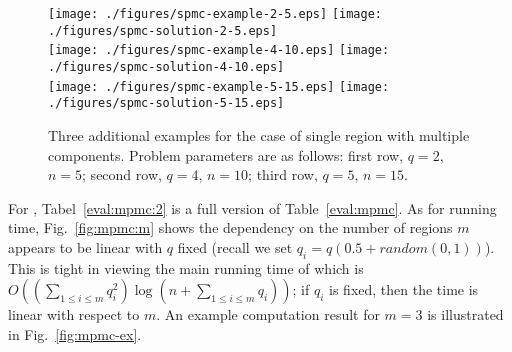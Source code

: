 \begin{figure}[ht!]
    \centering
    \texttt{[image: ./figures/spmc-example-2-5.eps]}
    \texttt{[image: ./figures/spmc-solution-2-5.eps]}
    \vspace*{2mm} \\
    \texttt{[image: ./figures/spmc-example-4-10.eps]}
    \texttt{[image: ./figures/spmc-solution-4-10.eps]} \\
    \vspace*{2mm}
    \texttt{[image: ./figures/spmc-example-5-15.eps]}
    \hspace{5mm}
    \texttt{[image: ./figures/spmc-solution-5-15.eps]}
    \vspace*{-3mm}
    \caption{\label{fig:opg-more-spmc-ex} Three additional examples for the 
		case of single region with multiple components. Problem parameters 
		are as follows: first row, $q = 2$, $n = 5$; second row, $q = 4$, 
		$n = 10$; third row, $q = 5$, $n = 15$.} 
    \vspace*{-4mm}
\end{figure}


For \algoMRG, Tabel~\ref{eval:mpmc:2} is a full version of 
Table~\ref{eval:mpmc}. As for running time, Fig.~\ref{fig:mpmc:m} shows 
the dependency on the number of regions $m$ appears to be linear with 
$q$ fixed (recall we set $q_i = q(0.5 + random(0,1))$). This is tight
in viewing the main running time of \algoMRG which is 
$O((\sum_{1\le i \le m} q_i^2) \log(n + \sum_{1\le i \le m} q_i))$; if
$q_i$ is fixed, then the time is linear with respect to $m$. An example 
computation result for $m = 3$ is illustrated in Fig.~\ref{fig:mpmc-ex}. 

